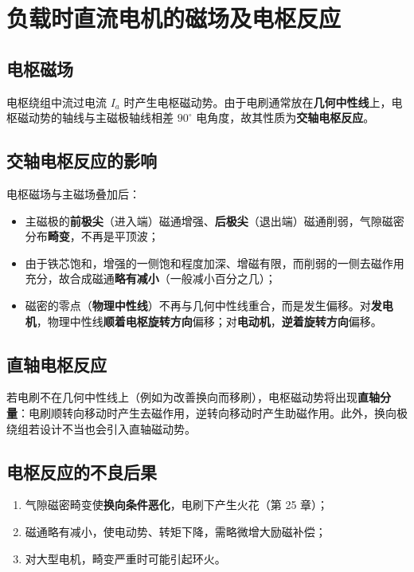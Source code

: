 \section{负载时直流电机的磁场及电枢反应}

\subsection{电枢磁场}
电枢绕组中流过电流 $I_a$ 时产生电枢磁动势。由于电刷通常放在\textbf{几何中性线}上，电枢磁动势的轴线与主磁极轴线相差 $90^\circ$ 电角度，故其性质为\textbf{交轴电枢反应}。

\subsection{交轴电枢反应的影响}
电枢磁场与主磁场叠加后：
\begin{itemize}
  \item 主磁极的\textbf{前极尖}（进入端）磁通增强、\textbf{后极尖}（退出端）磁通削弱，气隙磁密分布\textbf{畸变}，不再是平顶波；
  \item 由于铁芯饱和，增强的一侧饱和程度加深、增磁有限，而削弱的一侧去磁作用充分，故合成磁通\textbf{略有减小}（一般减小百分之几）；
  \item 磁密的零点（\textbf{物理中性线}）不再与几何中性线重合，而是发生偏移。对\textbf{发电机}，物理中性线\textbf{顺着电枢旋转方向}偏移；对\textbf{电动机}，\textbf{逆着旋转方向}偏移。
\end{itemize}

\subsection{直轴电枢反应}
若电刷不在几何中性线上（例如为改善换向而移刷），电枢磁动势将出现\textbf{直轴分量}：电刷顺转向移动时产生去磁作用，逆转向移动时产生助磁作用。此外，换向极绕组若设计不当也会引入直轴磁动势。

\subsection{电枢反应的不良后果}
\begin{enumerate}
  \item 气隙磁密畸变使\textbf{换向条件恶化}，电刷下产生火花（第 25 章）；
  \item 磁通略有减小，使电动势、转矩下降，需略微增大励磁补偿；
  \item 对大型电机，畸变严重时可能引起环火。
\end{enumerate}

